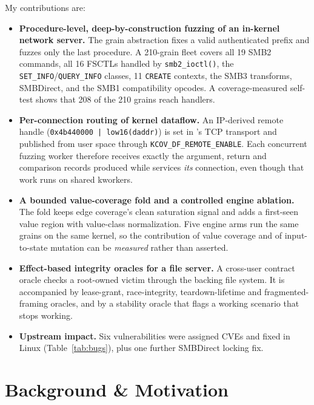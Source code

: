 \documentclass{article}
\begin{document}
My contributions are:
\begin{itemize}[nosep]
  \item \textbf{Procedure-level, deep-by-construction fuzzing of an in-kernel
        network server.} The grain abstraction fixes a valid authenticated
        prefix and fuzzes only the last procedure. A 210-grain fleet covers
        all 19 SMB2 commands, all 16 FSCTLs handled by \texttt{smb2\_ioctl()},
        the \texttt{SET\_INFO}/\texttt{QUERY\_INFO} classes, 11
        \texttt{CREATE} contexts, the SMB3 transforms, SMBDirect, and the SMB1
        compatibility opcodes. A coverage-measured self-test shows that 208 of
        the 210 grains reach \ksmbd handlers.
  \item \textbf{Per-connection routing of kernel dataflow.} An IP-derived
        remote handle (\texttt{0x4b440000 | low16(daddr)}) is set in
        \ksmbd's TCP transport and published from user space through
        \texttt{KCOV\_DF\_REMOTE\_ENABLE}. Each concurrent fuzzing worker
        therefore receives exactly the argument, return and comparison records
        produced while \ksmbd services \emph{its} connection, even though that
        work runs on shared kworkers.
  \item \textbf{A bounded value-coverage fold and a controlled engine
        ablation.} The fold keeps edge coverage's clean saturation signal and
        adds a first-seen value region with value-class normalization. Five
        engine arms run the same grains on the same kernel, so the
        contribution of value coverage and of input-to-state mutation can be
        \emph{measured} rather than asserted.
  \item \textbf{Effect-based integrity oracles for a file server.} A
        cross-user contract oracle checks a root-owned victim through the
        backing file system. It is accompanied by lease-grant, race-integrity,
        teardown-lifetime and fragmented-framing oracles, and by a stability
        oracle that flags a working scenario that stops working.
  \item \textbf{Upstream impact.} Six vulnerabilities were assigned CVEs and
        fixed in Linux (Table~\ref{tab:bugs}), plus one further SMBDirect
        locking fix.
\end{itemize}


\section{Background \& Motivation}\label{sec:background}
\end{document}
